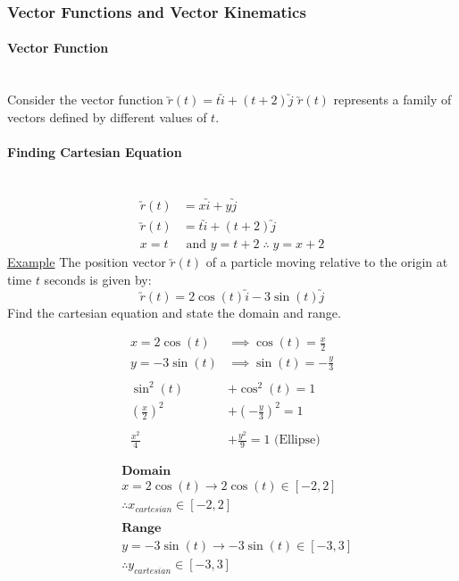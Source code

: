 \documentclass[a4paper]{article}
\begin{document}
			\subsubsection{Vector Functions and Vector Kinematics}
				\paragraph{Vector Function}\mbox{}\\
					Consider the vector function $\utilde{r}(t)=t\utilde{i}+(t+2)\utilde{j}$ \newline
					$\utilde{r}(t)$ represents a family of vectors defined by different values of $t$.
				\paragraph{Finding Cartesian Equation}\mbox{}\\
					\begin{align*}
						\utilde{r}(t)&=x\utilde{i}+y\utilde{j} \\
						\utilde{r}(t)&=t\utilde{i}+(t+2)\utilde{j} \\
						x=t&\text{ and }y=t+2\;\therefore\;y=x+2
					\end{align*}
					\newpage
					\noindent\underline{Example}\newline
					The position vector $\utilde{r}(t)$ of a particle moving relative to the origin at time $t$ seconds is given by:
					\[
						\utilde{r}(t)=2\cos(t)\utilde{i}-3\sin(t)\utilde{j}
					\]
					Find the cartesian equation and state the domain and range.\newline
					\begin{minipage}[t]{0.5\textwidth}
						\vspace{0pt}
						\begin{align*}
							x=2\cos(t)&\implies\cos(t)=\frac{x}{2} \\
							y=-3\sin(t)&\implies\sin(t)=-\frac{y}{3} \\\\
							\sin^2(t)&+\cos^2(t)=1 \\
							\left(\frac{x}{2}\right)^2&+\left(-\frac{y}{3}\right)^2=1 \\\\
							\frac{x^2}{4}&+\frac{y^2}{9}=1\text{ (Ellipse)}
						\end{align*}
					\end{minipage}
					\hfill
					\begin{minipage}[t]{0.5\textwidth}
						\vspace{0pt}
						\begin{align*}
							&\textbf{Domain}\\
							&x=2\cos(t)\rightarrow 2\cos(t)\in\left[-2,2\right] \\
							&\therefore x_{cartesian}\in\left[-2,2\right] \\\\
							&\textbf{Range} \\
							&y=-3\sin(t)\rightarrow -3\sin(t)\in\left[-3,3\right] \\
							&\therefore y_{cartesian}\in\left[-3,3\right] \\
						\end{align*}
					\end{minipage}
\end{document}
